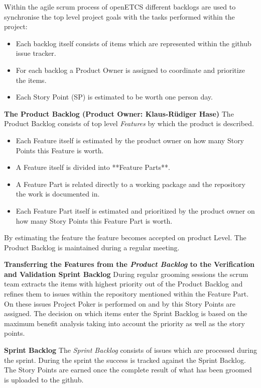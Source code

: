 \documentclass{template/openetcs_report}
\begin{document}
Within the agile scrum process of openETCS different backlogs are used to synchronise the top level project goals with the tasks performed within the project: 

\begin{itemize}
\item Each backlog itself consists of items which are represented within the github issue tracker. 
\item For each backlog a Product Owner is assigned to coordinate and prioritize the items.
\item Each Story Point (SP) is estimated to be worth one person day.
\end{itemize}


\textbf{The Product Backlog (Product Owner: Klaus-Rüdiger Hase)}
The Product Backlog consists of top level \textit{Features} by which the product is described.
\begin{itemize}
\item  Each Feature itself is estimated by the product owner on how many Story Points this Feature is worth.
\item  A Feature itself is divided into **Feature Parts**.
\item  A Feature Part is related directly to a working package and the repository the work is documented in.
\item  Each Feature Part itself is estimated and prioritized by the product owner on how many Story Points this Feature Part is worth.
\end{itemize}


By estimating the feature the feature becomes accepted on product Level.
The Product Backlog is maintained during a regular meeting.

\textbf{Transferring the Features from the \textit{Product Backlog} to the Verification and Validation Sprint Backlog}
During regular grooming sessions the scrum team extracts the items with highest priority out of the Product Backlog and refines them to issues within the repository mentioned within the Feature Part.
On these issues Project Poker is performed on and by this Story Points are assigned. The decision on which items enter the Sprint Backlog is based on the maximum benefit analysis taking into account the priority as well as the story points.

\textbf{Sprint Backlog}
The \textit{Sprint Backlog} consists of issues which are processed during the sprint.
During the sprint the success is tracked against the Sprint Backlog.
The Story Points are earned once the complete result of what has been groomed is uploaded to the github.
\end{document}
